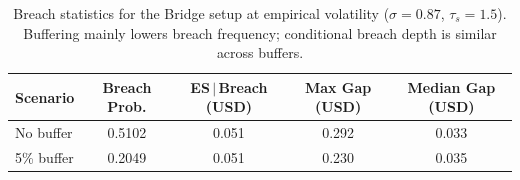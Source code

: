 \begin{table}[t]
\centering
\footnotesize
\caption{Breach statistics for the Bridge setup at empirical volatility ($\sigma{=}0.87$, $\tau_s{=}1.5$). Buffering mainly lowers breach frequency; conditional breach depth is similar across buffers.}
\label{tab:bridge_breach_stats}
\begin{tabular}{l c c c c}
\hline
Scenario & Breach Prob. & ES$\,|\,$Breach (USD) & Max Gap (USD) & Median Gap (USD) \\
\hline
No buffer & 0.5102 & 0.051 & 0.292 & 0.033 \\
5\% buffer & 0.2049 & 0.051 & 0.230 & 0.035 \\
\hline
\end{tabular}
\end{table}
